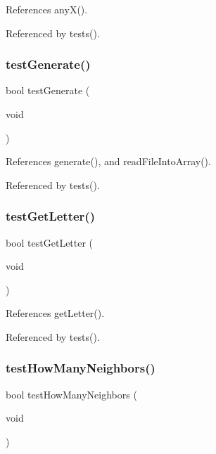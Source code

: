 References any\+X().



Referenced by tests().

\mbox{\label{tests_8c_a452bec98ef4419a18c4f15592208ee7b}} 
\subsubsection{test\+Generate()}
{\footnotesize\ttfamily bool test\+Generate (\begin{DoxyParamCaption}\item[{void}]{ }\end{DoxyParamCaption})}



References generate(), and read\+File\+Into\+Array().



Referenced by tests().

\mbox{\label{tests_8c_a9b70c29f84da569aff4c79611734cae7}} 
\subsubsection{test\+Get\+Letter()}
{\footnotesize\ttfamily bool test\+Get\+Letter (\begin{DoxyParamCaption}\item[{void}]{ }\end{DoxyParamCaption})}



References get\+Letter().



Referenced by tests().

\mbox{\label{tests_8c_a61a9bf4e92f96b3669a4eb9c2af3eca9}} 
\subsubsection{test\+How\+Many\+Neighbors()}
{\footnotesize\ttfamily bool test\+How\+Many\+Neighbors (\begin{DoxyParamCaption}\item[{void}]{ }\end{DoxyParamCaption})}



